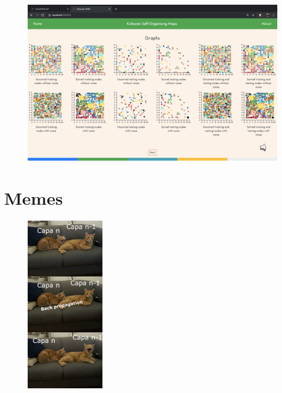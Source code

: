 \documentclass[fleqn, journal, onecolumn]{IEEEtran}             %
\theoremstyle{break}                                            %
\begin{document}
      \begin{figure}[h!]
        \centering
        \includegraphics[width=\textwidth]{Tesis9}
      \end{figure}


  \clearpage
  \section{Memes}

  \begin{figure}[h!]
    \centering
    \includegraphics[width=0.3\textwidth]{a}
  \end{figure}
\end{document}
